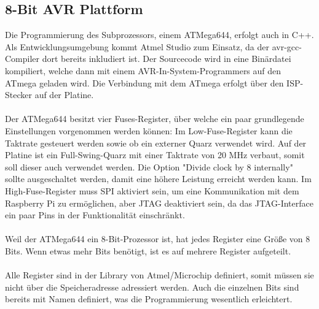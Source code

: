 \documentclass[12pt]{article}
\begin{document}
\subsection{8-Bit AVR Plattform}
Die Programmierung des Subprozessors, einem ATMega644, erfolgt auch in C++. Als 
Entwicklungsumgebung kommt Atmel Studio zum Einsatz, da der avr-gcc-Compiler dort bereits inkludiert ist. Der Sourcecode wird in eine Binärdatei kompiliert, welche dann mit einem AVR-In-System-Programmers auf den ATmega geladen wird. Die Verbindung mit dem ATmega erfolgt über den ISP-Stecker auf der Platine. 
\\\\Der ATMega644 besitzt vier Fuses-Register, über welche ein paar grundlegende Einstellungen vorgenommen werden können: Im Low-Fuse-Register kann die Taktrate gesteuert werden sowie ob ein externer Quarz verwendet wird. Auf der Platine ist ein Full-Swing-Quarz mit einer Taktrate von 20 MHz verbaut, somit soll dieser auch verwendet werden. Die Option "Divide clock by 8 internally" sollte ausgeschaltet werden, damit eine höhere Leistung erreicht werden kann. Im High-Fuse-Register muss SPI aktiviert sein, um eine Kommunikation mit dem Raspberry Pi zu ermöglichen, aber JTAG deaktiviert sein, da das JTAG-Interface ein paar Pins in der Funktionalität einschränkt.
\\\\Weil der ATMega644 ein 8-Bit-Prozessor ist, hat jedes Register eine Größe von 8 Bits. Wenn etwas mehr Bits benötigt, ist es auf mehrere Register aufgeteilt.\\\\
Alle Register sind in der Library von Atmel/Microchip definiert, somit müssen sie nicht über die Speicheradresse adressiert werden. Auch die einzelnen Bits sind bereits mit Namen definiert, was die Programmierung wesentlich erleichtert. 
\end{document}
